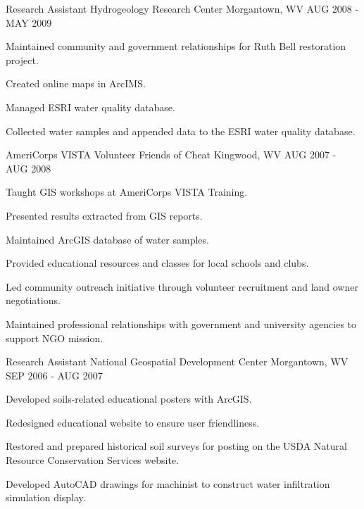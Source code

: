 \begin{cventries}

\cventry
{Research Assistant} %
{Hydrogeology Research Center} %
{Morgantown, WV} %
{AUG 2008 - MAY 2009} %
{ %
\begin{cvitems}
\item {Maintained community and government relationships for Ruth Bell restoration project.}
\item {Created online maps in ArcIMS.}
\item {Managed ESRI water quality database.}
\item {Collected water samples and appended data to the ESRI water quality database.}
\end{cvitems}
}


\cventry
{AmeriCorps VISTA Volunteer} %
{Friends of Cheat} %
{Kingwood, WV} %
{AUG 2007 - AUG 2008} %
{ %
\begin{cvitems}
\item {Taught GIS workshops at AmeriCorps VISTA Training.}
\item {Presented results extracted from GIS reports.}
\item {Maintained ArcGIS database of water samples.}
\item {Provided educational resources and classes for local schools and clubs.}
\item {Led community outreach initiative through volunteer recruitment and land owner negotiations.}
\item {Maintained professional relationships with government and university agencies to support NGO mission.}
\end{cvitems}
}


\cventry
{Research Assistant} %
{National Geospatial Development Center} %
{Morgantown, WV} %
{SEP 2006 - AUG 2007} %
{ %
\begin{cvitems}
\item {Developed soils-related educational posters with ArcGIS.}
\item {Redesigned educational website to ensure user friendliness.}
\item {Restored and prepared historical soil surveys for posting on the USDA Natural Resource Conservation Services website.}
\item {Developed AutoCAD drawings for machinist to construct water infiltration simulation display.}
\end{cvitems}
}

\vspace{-3mm}
\end{cventries}